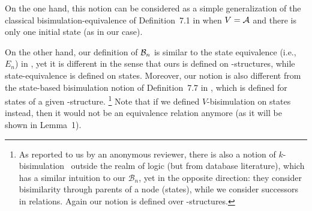 \documentclass{article}
\begin{document}
On the one hand,  this notion can be considered as a simple generalization of the classical
bisimulation-equivalence of Definition~7.1 in \cite{Baier:PMC:2008} when $V=\cal A$ and there is only one initial state (as in our case).

On the other hand, our definition of ${{\cal B}_n}$ is similar to
the state equivalence (i.e., $E_n$) in \cite{browne1988characterizing}, yet it is
different in the sense that ours is defined on \MPK-structures,
while state-equivalence is defined on states.
Moreover, our notion is also different
from  the state-based bisimulation notion of Definition~7.7 in \cite{Baier:PMC:2008},
which is defined for states of a given \MPK-structure. \footnote{As reported to us by an anonymous reviewer, there is also a notion of $k$-bisimulation~\cite{kaushik2002updates} outside the realm of logic (but from database literature), which has a similar intuition to our $\mathcal{B}_n$, yet in the opposite direction: they consider bisimilarity through parents of a node (states), while we consider successors in relations. Again our notion is defined over \MPK-structures.} Note that if we defined $V$-bisimulation on  states instead, then it would not be an equivalence relation anymore (as it will be shown in Lemma~1).
\end{document}
